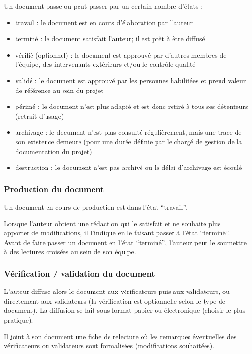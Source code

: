 \documentclass[a4paper]{article}
\begin{document}
Un document passe ou peut passer par un certain nombre d'états :

\begin{itemize}
\item travail : le document est en cours d'élaboration par l'auteur
\item terminé : le document satisfait l'auteur; il est prêt à être diffusé
\item vérifié (optionnel) : le document est approuvé par d'autres membres de l'équipe, des intervenants extérieurs et/ou le contrôle qualité
\item validé : le document est approuvé par les personnes habilitées et prend valeur de référence au sein du projet
\item périmé : le document n’est plus adapté et est donc retiré à tous ses détenteurs (retrait d'usage)
\item archivage : le document n'est plus consulté régulièrement, mais une trace de son existence demeure (pour une durée définie par le chargé de gestion de la documentation du projet)
\item destruction : le document n'est pas archivé ou le délai d'archivage est écoulé
\end{itemize}


\subsubsection{Production du document}

Un document en cours de production est dans l'état ``travail''.

Lorsque l'auteur obtient une rédaction qui le satisfait et ne souhaite plus apporter de modifications, il l'indique en le faisant passer à l'état ``terminé''.
Avant de faire passer un document en l'état ``terminé'', l'auteur peut le soumettre à des lectures croisées au sein de son équipe.

\subsubsection{Vérification / validation du document}

L'auteur diffuse alors le document aux vérificateurs puis aux validateurs, ou directement aux validateurs (la vérification est optionnelle selon le type de document). La diffusion se fait sous format papier ou électronique (choisir le plus pratique).

Il joint à son document une fiche de relecture où les remarques éventuelles des vérificateurs ou validateurs sont formalisées (modifications souhaitées).
\end{document}
